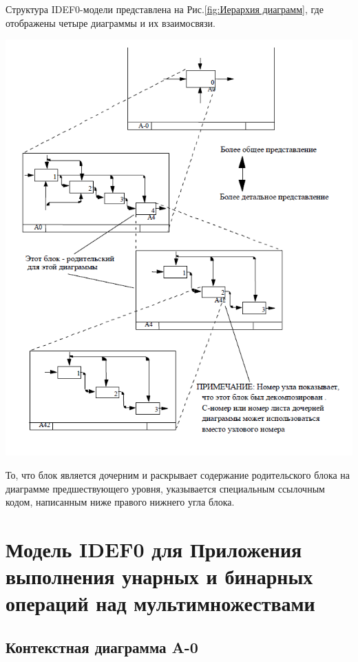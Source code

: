 \documentclass[a4paper, final]{article}
\begin{document}
\par Структура IDEF0-модели представлена  на Рис.\ref{fig:Иерархия диаграмм}, где отображены четыре диаграммы и их взаимосвязи. 
\begin{center}
	\includegraphics[scale=0.8]{ierarchy.png}
	\label{fig:Иерархия диаграмм}
\end{center}


То, что блок является дочерним и раскрывает содержание родительского блока на диаграмме предшествующего уровня, указывается специальным ссылочным кодом, написанным ниже правого нижнего угла блока.



\newpage
\section{Модель IDEF0 для Приложения выполнения унарных и бинарных операций над мультимножествами}
\subsection{Контекстная диаграмма A-0}
\end{document}
